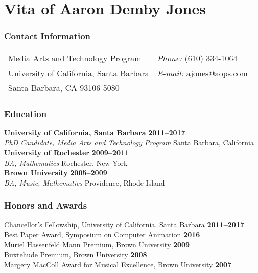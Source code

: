 {
\singlespace
\setlength{\parindent}{0em}
\setlength{\parskip}{1em}

\chapter*{Vita of Aaron Demby Jones}

\subsection*{Contact Information}
\vspace{.05in}
\begin{tabular}{@{}p{3.5in}p{4in}}
Media Arts and Technology Program & {\it Phone:}  (610) 334-1064\\             
University of California, Santa Barbara & {\it E-mail:} ajones@aops.com\\       
Santa Barbara, CA 93106-5080\\
\end{tabular}

\subsection*{Education}
  {\bf University of California, Santa Barbara} \hfill {\bf 2011--2017}\\
  {\em PhD Candidate, Media Arts and Technology Program} \hfill Santa Barbara,
  California\\[-3ex]

  {\bf University of Rochester}  \hfill {\bf 2009--2011}\\
  {\em BA, Mathematics} \hfill Rochester, New York\\[-3ex]
  
  {\bf Brown University}  \hfill {\bf 2005--2009}\\
  {\em BA, Music, Mathematics} \hfill Providence, Rhode Island\\[-3ex]

\subsection*{Honors and Awards} 
Chancellor's Fellowship, University of California, Santa Barbara \hfill {\bf 2011--2017}\\
Best Paper Award, Symposium on Computer Animation \hfill  {\bf 2016}\\
Muriel Hassenfeld Mann Premium, Brown University \hfill  {\bf 2009}\\
Buxtehude Premium, Brown University \hfill {\bf 2008}\\
Margery MacColl Award for Musical Excellence, Brown University  \hfill {\bf 2007}\\

}
